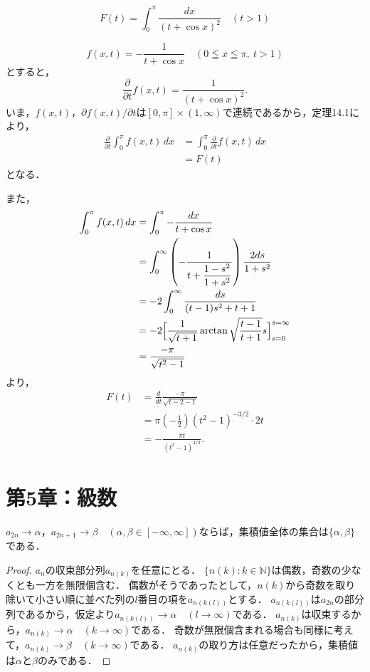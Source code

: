 \documentclass[a4paper,10pt,fleqn]{ltjsarticle}
\begin{document}
\begin{tleftbar}
\[
F(t) = \int_0^\pi \frac{dx}{(t + \cos x)^2} \quad (t > 1)
\]

\[
f(x,t) = - \frac{1}{t+\cos x} \quad ( 0 \leqq x \leqq \pi , ~ t>1)
\]
とすると，
\[
\frac{\partial}{\partial t}  f(x,t) = \frac{1}{(t+\cos x)^2}.
\]
いま，$f(x,t)$，$\partial f(x,t) / \partial t $は$[0,\pi] \times (1,\infty)$で連続であるから，定理14.1により，
\begin{align*} 
    \frac{\partial}{\partial t} \int_0^\pi f(x,t) \, dx & = \int_0^\pi \frac{\partial}{\partial t} f(x,t) \, dx \\
    & = F(t)
\end{align*}
となる．

また，
\begin{align*} 
    \int_0^\pi f(x,t) \, dx & = \int_0^\pi - \frac{dx}{t+\cos x}\\
    & = \int_0^\infty \left ( - \frac{1}{t+\dfrac{1-s^2}{1+s^2}} \right) \frac{2ds}{1+s^2} \\
    & = -2\int_0^\infty \frac{ds}{(t-1)s^2+t+1}  \\
    & = -2 \Bigl [ \frac{1}{\sqrt{t+1}} \arctan \sqrt{\frac{t-1}{t+1}}s \Bigr]_{s=0}^{s=\infty} \\
    & = \frac{-\pi}{\sqrt{t^2-1}}
\end{align*}
より，
\begin{align*} 
    F(t) & = \frac{d}{dt} \frac{-\pi}{\sqrt{t-2-1}} \\
    & = \pi \left(-\frac{1}{2} \right) (t^2-1)^{-3/2} \cdot 2t \\
    & = -\frac{\pi t}{(t^2-1)^{3/2}}.
\end{align*}
\end{tleftbar}

\newpage 

\section*{第5章：級数}

$a_{2n} \to \alpha$，$a_{2n+1} \to \beta$$\quad (\alpha,\beta \in [-\infty,\infty])$ならば，集積値全体の集合は$\{\alpha,\beta\}$である．

\begin{proof}
$a_n$の収束部分列$a_{n(k)}$を任意にとる．
$\{n(k):k \in \mathbb{N}\}$は偶数，奇数の少なくとも一方を無限個含む．
偶数がそうであったとして，$n(k)$から奇数を取り除いて小さい順に並べた列の$l$番目の項を$a_{n(k(l))}$とする．
$a_{n(k(l))}$は$a_{2n}$の部分列であるから，仮定より$a_{n(k(l))} \to \alpha \quad (l \to \infty)$である．
$a_{n(k)}$は収束するから，$a_{n(k)} \to \alpha \quad (k \to \infty)$である．
奇数が無限個含まれる場合も同様に考えて，$a_{n(k)} \to \beta \quad (k \to \infty)$である．
$a_{n(k)}$の取り方は任意だったから，集積値は$\alpha$と$\beta$のみである．
\end{proof}
\end{document}
